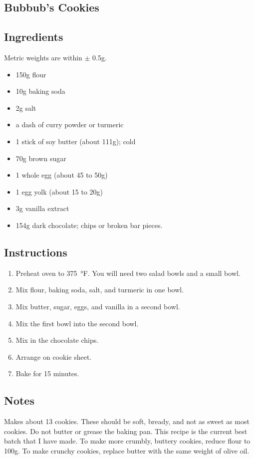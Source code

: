 \documentclass[12pt, letterpaper]{article}
\begin{document}
\thispagestyle{empty}
\twocolumn

\begin{flushleft}
\section*{Bubbub's Cookies}
\subsection*{Ingredients}
Metric weights are within $\pm$ 0.5g.

\begin{itemize}
\item 150g flour
\item 10g baking soda
\item 2g salt
\item a dash of curry powder or turmeric
\item 1 stick of soy butter (about 111g); cold
\item 70g brown sugar
\item 1 whole egg (about 45 to 50g)
\item 1 egg yolk (about 15 to 20g)
\item 3g vanilla extract
\item 154g dark chocolate; chips or broken bar pieces.
\end{itemize}

\subsection*{Instructions}
\begin{enumerate}
\item Preheat oven to \SI{375}{\degree}F. You will need two salad bowls and a small bowl.
\item Mix flour, baking soda, salt, and turmeric in one bowl.
\item Mix butter, sugar, eggs, and vanilla in a second bowl.
\item Mix the first bowl into the second bowl.
\item Mix in the chocolate chips.
\item Arrange on cookie sheet.
\item Bake for 15 minutes.
\end{enumerate}


\subsection*{Notes}
Makes about 13 cookies. These should be soft, bready, and not as sweet as most cookies. Do not butter or grease the baking pan. This recipe is the current best batch that I have made. To make more crumbly, buttery cookies, reduce flour to 100g. To make crunchy cookies, replace butter with the same weight of olive oil.


\end{flushleft}
\end{document}
